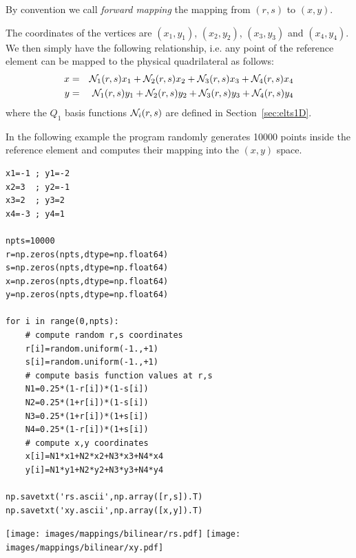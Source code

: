 By convention we call {\it forward mapping} the mapping from $(r,s)$
to $(x,y)$.

The coordinates of the vertices are 
$(x_1,y_1)$, $(x_2,y_2)$, $(x_3,y_3)$ and $(x_4,y_4)$.
We then simply have the 
following relationship, i.e. any point of the reference element 
can be mapped to the physical quadrilateral as follows:
\begin{eqnarray}
x&=& {\mathcal{N}}_1(r,s) x_1 + {\mathcal{N}}_2(r,s) x_2 + {\mathcal{N}}_3(r,s) x_3 + {\mathcal{N}}_4(r,s) x_4 \nonumber\\
y&=& {\mathcal{N}}_1(r,s) y_1 + {\mathcal{N}}_2(r,s) y_2 + {\mathcal{N}}_3(r,s) y_3 + {\mathcal{N}}_4(r,s) y_4 \label{mapppQ1a} 
\end{eqnarray} 
where the $Q_1$ basis functions ${\mathcal{N}}_i(r,s)$ are defined in Section~\ref{sec:elts1D}.

In the following example the program randomly generates 10000 points 
inside the reference 
element and computes their mapping into the $(x,y)$ space. 

\begin{lstlisting}
x1=-1 ; y1=-2
x2=3  ; y2=-1
x3=2  ; y3=2
x4=-3 ; y4=1

npts=10000
r=np.zeros(npts,dtype=np.float64)   
s=np.zeros(npts,dtype=np.float64)   
x=np.zeros(npts,dtype=np.float64)   
y=np.zeros(npts,dtype=np.float64)   

for i in range(0,npts):
    # compute random r,s coordinates
    r[i]=random.uniform(-1.,+1)
    s[i]=random.uniform(-1.,+1)
    # compute basis function values at r,s
    N1=0.25*(1-r[i])*(1-s[i])
    N2=0.25*(1+r[i])*(1-s[i])
    N3=0.25*(1+r[i])*(1+s[i])
    N4=0.25*(1-r[i])*(1+s[i])
    # compute x,y coordinates
    x[i]=N1*x1+N2*x2+N3*x3+N4*x4
    y[i]=N1*y1+N2*y2+N3*y3+N4*y4

np.savetxt('rs.ascii',np.array([r,s]).T)
np.savetxt('xy.ascii',np.array([x,y]).T)
\end{lstlisting}

\begin{center}
\texttt{[image: images/mappings/bilinear/rs.pdf]}
\texttt{[image: images/mappings/bilinear/xy.pdf]}
\end{center}

